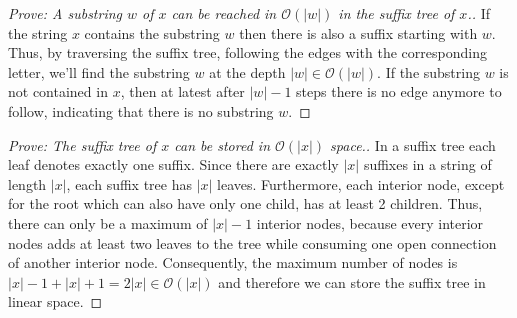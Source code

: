 \documentclass[a4paper, 12pt, titlepage]{article}
\begin{document}
\begin{proof}[Prove: A substring $w$ of $x$ can be reached in $\mathcal{O}(|w|)$ in the suffix tree of $x$.]

If the string $x$ contains the substring $w$ then there is also a suffix starting with $w$.
Thus, by traversing the suffix tree, following the edges with the corresponding letter, we'll find the substring $w$ at the depth $|w| \in \mathcal{O}(|w|)$.
If the substring $w$ is not contained in $x$, then at latest after $|w|-1$ steps there is no edge anymore to follow, indicating that there is no substring $w$.

\end{proof}

\begin{proof}[Prove: The suffix tree of $x$ can be stored in $\mathcal{O}(|x|)$ space.]
	In a suffix tree each leaf denotes exactly one suffix.
	Since there are exactly $|x|$ suffixes in a string of length $|x|$, each suffix tree has $|x|$ leaves.
	Furthermore, each interior node, except for the root which can also have only one child, has at least 2 children.
	Thus, there can only be a maximum of $|x|-1$ interior nodes, because every interior nodes adds at least two leaves to the tree while consuming one open connection of another interior node.
	Consequently, the maximum number of nodes is $|x|-1+|x|+1=2|x| \in \mathcal{O}(|x|)$ and therefore we can store the suffix tree in linear space.
\end{proof}
\end{document}
